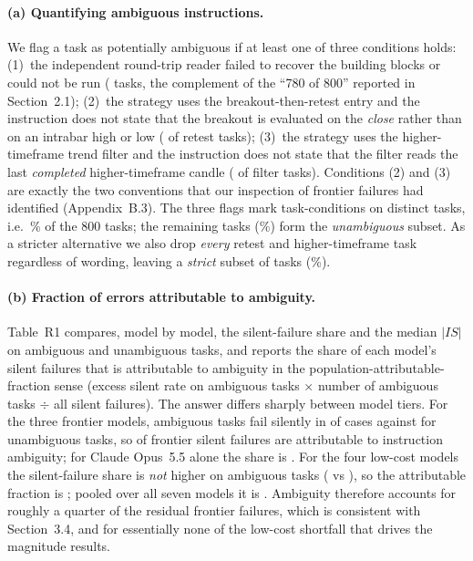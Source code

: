 \documentclass[11pt,a4paper]{article}
\begin{document}
\paragraph{(a) Quantifying ambiguous instructions.} We flag a task as potentially ambiguous if at least one of three conditions holds: (1)~the independent round-trip reader failed to recover the building blocks or could not be run (\RevAmbRtCount{} tasks, the complement of the ``780 of 800'' reported in Section~2.1); (2)~the strategy uses the breakout-then-retest entry and the instruction does not state that the breakout is evaluated on the \emph{close} rather than on an intrabar high or low (\RevAmbBpCount{} of \RevAmbBpTotal{} retest tasks); (3)~the strategy uses the higher-timeframe trend filter and the instruction does not state that the filter reads the last \emph{completed} higher-timeframe candle (\RevAmbHtfCount{} of \RevAmbHtfTotal{} filter tasks). Conditions (2) and (3) are exactly the two conventions that our inspection of frontier failures had identified (Appendix~B.3). The three flags mark \RevAmbSumFlags{} task-conditions on \RevAmbCount{} distinct tasks, i.e.\ \RevAmbShare\% of the 800 tasks; the remaining \RevUnambCount{} tasks (\RevUnambShare\%) form the \emph{unambiguous} subset. As a stricter alternative we also drop \emph{every} retest and higher-timeframe task regardless of wording, leaving a \emph{strict} subset of \RevStrictCount{} tasks (\RevStrictShare\%).

\paragraph{(b) Fraction of errors attributable to ambiguity.} Table~R1 compares, model by model, the silent-failure share and the median $|IS|$ on ambiguous and unambiguous tasks, and reports the share of each model's silent failures that is attributable to ambiguity in the population-attributable-fraction sense (excess silent rate on ambiguous tasks $\times$ number of ambiguous tasks $\div$ all silent failures). The answer differs sharply between model tiers. For the three frontier models, ambiguous tasks fail silently in \RevAttrFrontSilentAm{} of cases against \RevAttrFrontSilentUn{} for unambiguous tasks, so \RevAttrFrontShare{} of frontier silent failures are attributable to instruction ambiguity; for Claude Opus~5.5 alone the share is \RevAttrOpusShare. For the four low-cost models the silent-failure share is \emph{not} higher on ambiguous tasks (\RevAttrLowSilentAm{} vs \RevAttrLowSilentUn), so the attributable fraction is \RevAttrLowShare; pooled over all seven models it is \RevAttrAllShare. Ambiguity therefore accounts for roughly a quarter of the residual frontier failures, which is consistent with Section~3.4, and for essentially none of the low-cost shortfall that drives the magnitude results.
\end{document}
